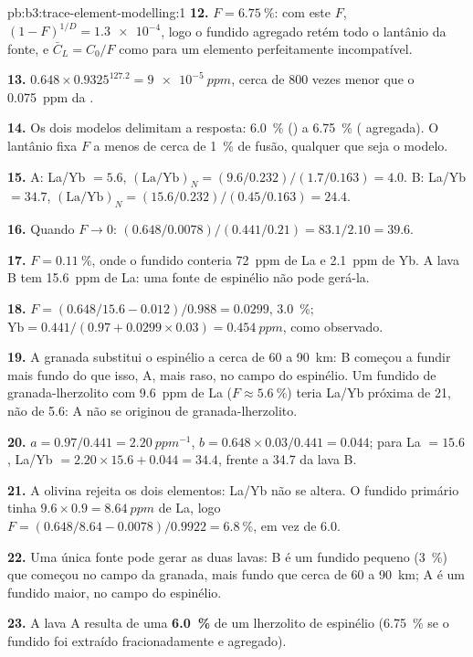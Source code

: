 \begin{solution}{pb:b3:trace-element-modelling:1}
\textbf{12.} $F = \qty{6.75}{\percent}$: com este $F$, $(1 - F)^{1/D} =
\num{1.3e-4}$, logo o fundido agregado retém todo o lantânio da fonte, e
$\bar C_L = C_0/F$ como para um elemento perfeitamente incompatível.

\textbf{13.} $0.648\times0.9325^{127.2} = \qty{9e-5}{ppm}$, cerca de 800 vezes
menor que o \qty{0.075}{ppm} da .

\textbf{14.} Os dois modelos delimitam a resposta: \qty{6.0}{\percent} ()
a \qty{6.75}{\percent} ( agregada). O lantânio fixa $F$ a menos de
cerca de \qty{1}{\percent} de fusão, qualquer que seja o modelo.

\textbf{15.} A: La/Yb $= 5.6$, $(\mathrm{La}/\mathrm{Yb})_N =
(9.6/0.232)/(1.7/0.163) = 4.0$. B: La/Yb $= 34.7$, $(\mathrm{La}/\mathrm{Yb})_N
= (15.6/0.232)/(0.45/0.163) = 24.4$.

\textbf{16.} Quando $F \to 0$: $(0.648/0.0078)/(0.441/0.21) = 83.1/2.10 = 39.6$.

\textbf{17.} $F = \qty{0.11}{\percent}$, onde o fundido conteria
\qty{72}{ppm} de La e \qty{2.1}{ppm} de Yb. A lava B tem \qty{15.6}{ppm} de La: uma
fonte de espinélio não pode gerá-la.

\textbf{18.} $F = (0.648/15.6 - 0.012)/0.988 = 0.0299$, \qty{3.0}{\percent};
$\mathrm{Yb} = 0.441/(0.97 + 0.0299\times0.03) = \qty{0.454}{ppm}$, como
observado.

\textbf{19.} A granada substitui o espinélio a cerca de 60 a \qty{90}{km}: B começou a
fundir mais fundo do que isso, A, mais raso, no campo do espinélio. Um fundido de granada-lherzolito
com \qty{9.6}{ppm} de La ($F \approx \qty{5.6}{\percent}$) teria La/Yb
próxima de 21, não de 5.6: A não se originou de granada-lherzolito.

\textbf{20.} $a = 0.97/0.441 = \qty{2.20}{ppm^{-1}}$, $b = 0.648\times0.03/0.441
= 0.044$; para La $= 15.6$, La/Yb $= 2.20\times15.6 + 0.044 = 34.4$, frente a
34.7 da lava B.

\textbf{21.} A olivina rejeita os dois elementos: La/Yb não se altera. O
fundido primário tinha $9.6\times0.9 = \qty{8.64}{ppm}$ de La, logo $F = (0.648/8.64 -
0.0078)/0.9922 = \qty{6.8}{\percent}$, em vez de 6.0.

\textbf{22.} Uma única fonte pode gerar as duas lavas: B é um fundido pequeno
(\qty{3}{\percent}) que começou no campo da granada, mais fundo que cerca de 60 a
\qty{90}{km}; A é um fundido maior, no campo do espinélio.

\textbf{23.} A lava A resulta de uma \textbf{\qty[text-series-to-math=true]{6.0}{\percent}}
 de um lherzolito de espinélio (\qty{6.75}{\percent} se o fundido foi
extraído fracionadamente e agregado).
\end{solution}
